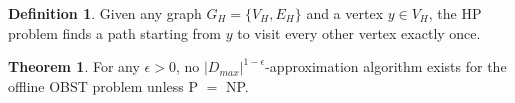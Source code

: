 \documentclass[10pt, conference, letterpaper]{IEEEtran}
\theoremstyle{definition}
\newtheorem{defi}{Definition}
\newtheorem{theo}{Theorem}
\begin{document}

\begin{defi} \label{defi: Hamiltonian path}
Given any graph $G_H=\{V_H,E_H\}$ and a vertex $y\in V_H$, the HP problem finds a path starting from $y$ to visit every other vertex exactly once.
\end{defi}

\begin{theo} \label{theo: hardness}
For any $\epsilon >0$, no $|D_{max}|^{1-\epsilon}$-approximation algorithm exists for the offline OBST problem unless P $=$ NP.
\end{theo}
\end{document}
